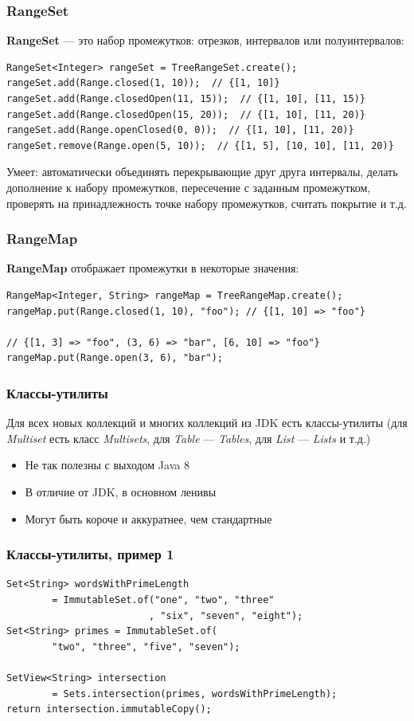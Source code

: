 \documentclass[xetex,mathserif,serif]{beamer}
\begin{document}
	\begin{frame}[fragile]
		\frametitle{RangeSet}
		\textbf{RangeSet} --- это набор промежутков: отрезков, интервалов или полуинтервалов:
		
		\begin{verbatim}
RangeSet<Integer> rangeSet = TreeRangeSet.create();
rangeSet.add(Range.closed(1, 10));  // {[1, 10]}
rangeSet.add(Range.closedOpen(11, 15));  // {[1, 10], [11, 15)}
rangeSet.add(Range.closedOpen(15, 20));  // {[1, 10], [11, 20)}
rangeSet.add(Range.openClosed(0, 0));  // {[1, 10], [11, 20)}
rangeSet.remove(Range.open(5, 10));  // {[1, 5], [10, 10], [11, 20)}
		\end{verbatim}
		
		Умеет: автоматически объединять перекрывающие друг друга интервалы, делать дополнение к набору промежутков, пересечение с заданным промежутком, проверять на принадлежность точке набору промежутков, считать покрытие и т.д.
\end{frame}

	\begin{frame}[fragile]
		\frametitle{RangeMap}
		\textbf{RangeMap} отображает промежутки в некоторые значения:
		
		\begin{verbatim}
RangeMap<Integer, String> rangeMap = TreeRangeMap.create();
rangeMap.put(Range.closed(1, 10), "foo"); // {[1, 10] => "foo"}

// {[1, 3] => "foo", (3, 6) => "bar", [6, 10] => "foo"}
rangeMap.put(Range.open(3, 6), "bar"); 
		\end{verbatim}
\end{frame}

	\begin{frame}
		\frametitle{Классы-утилиты}
		Для всех новых коллекций и многих коллекций из JDK есть классы-утилиты (для \textit{Multiset} есть класс \textit{Multisets}, для \textit{Table} --- \textit{Tables}, для \textit{List} --- \textit{Lists} и т.д.)
		\begin{itemize}
			\item Не так полезны с выходом Java 8
			\item В отличие от JDK, в основном ленивы
			\item Могут быть короче и аккуратнее, чем стандартные
		\end{itemize}
	\end{frame}

	\begin{frame}[fragile]
		\frametitle{Классы-утилиты, пример 1}
		\begin{verbatim}
Set<String> wordsWithPrimeLength 
        = ImmutableSet.of("one", "two", "three"
                         , "six", "seven", "eight");
Set<String> primes = ImmutableSet.of(
        "two", "three", "five", "seven");

SetView<String> intersection 
        = Sets.intersection(primes, wordsWithPrimeLength);
return intersection.immutableCopy();
		\end{verbatim}
\end{frame}
\end{document}
